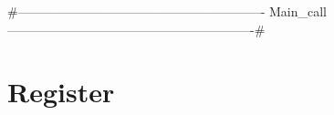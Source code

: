 {#----------------------------------------------------------
 Main_call
----------------------------------------------------------#}
\section{Register}
